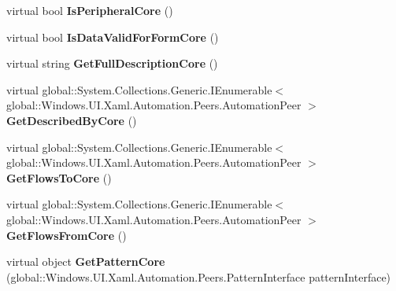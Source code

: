 \begin{DoxyCompactItemize}
virtual bool {\bfseries Is\+Peripheral\+Core} ()
\item 
\mbox{\label{class_windows_1_1_u_i_1_1_xaml_1_1_automation_1_1_peers_1_1_automation_peer_a375e173803947dba5bb2ee40016d54e9}} 
virtual bool {\bfseries Is\+Data\+Valid\+For\+Form\+Core} ()
\item 
\mbox{\label{class_windows_1_1_u_i_1_1_xaml_1_1_automation_1_1_peers_1_1_automation_peer_a03e2b030728b5480baca09928e51811f}} 
virtual string {\bfseries Get\+Full\+Description\+Core} ()
\item 
\mbox{\label{class_windows_1_1_u_i_1_1_xaml_1_1_automation_1_1_peers_1_1_automation_peer_af229ab1160fae56261351af4e4f4e4ab}} 
virtual global\+::\+System.\+Collections.\+Generic.\+I\+Enumerable$<$ global\+::\+Windows.\+U\+I.\+Xaml.\+Automation.\+Peers.\+Automation\+Peer $>$ {\bfseries Get\+Described\+By\+Core} ()
\item 
\mbox{\label{class_windows_1_1_u_i_1_1_xaml_1_1_automation_1_1_peers_1_1_automation_peer_a539ef8ed84355a4ed89c67cfc12b13cb}} 
virtual global\+::\+System.\+Collections.\+Generic.\+I\+Enumerable$<$ global\+::\+Windows.\+U\+I.\+Xaml.\+Automation.\+Peers.\+Automation\+Peer $>$ {\bfseries Get\+Flows\+To\+Core} ()
\item 
\mbox{\label{class_windows_1_1_u_i_1_1_xaml_1_1_automation_1_1_peers_1_1_automation_peer_af28cc07b8f441e466107608f74339c8f}} 
virtual global\+::\+System.\+Collections.\+Generic.\+I\+Enumerable$<$ global\+::\+Windows.\+U\+I.\+Xaml.\+Automation.\+Peers.\+Automation\+Peer $>$ {\bfseries Get\+Flows\+From\+Core} ()
\item 
\mbox{\label{class_windows_1_1_u_i_1_1_xaml_1_1_automation_1_1_peers_1_1_automation_peer_aa044472b4231fb26f5f1f9c526533020}} 
virtual object {\bfseries Get\+Pattern\+Core} (global\+::\+Windows.\+U\+I.\+Xaml.\+Automation.\+Peers.\+Pattern\+Interface pattern\+Interface)

\end{DoxyCompactItemize}
